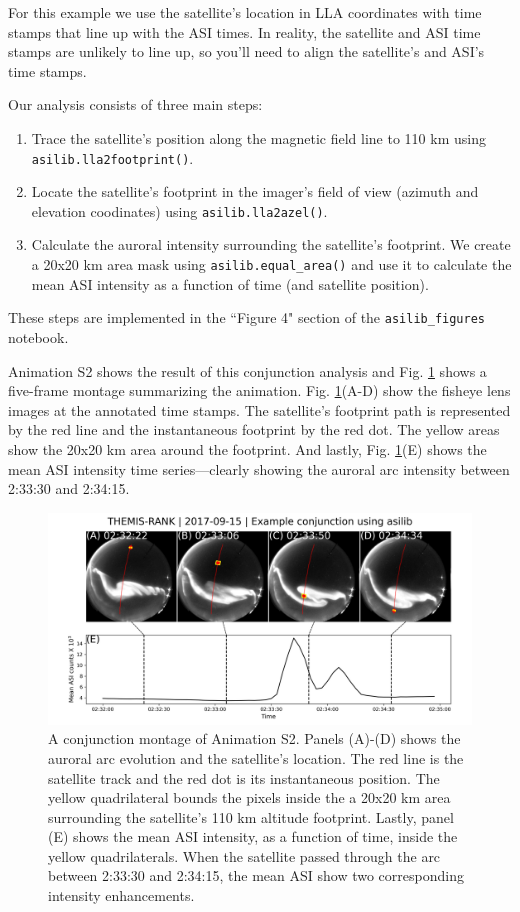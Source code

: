 \documentclass[utf8]{FrontiersinHarvard} %
\begin{document}
For this example we use the satellite's location in LLA coordinates with time stamps that line up with the ASI times. In reality, the satellite and ASI time stamps are unlikely to line up, so you'll need to align the satellite's and ASI's time stamps.

Our analysis consists of three main steps:
\begin{enumerate}
    \item Trace the satellite's position along the magnetic field line to 110 km using  \verb|asilib.lla2footprint()|.
    \item Locate the satellite's footprint in the imager's field of view (azimuth and elevation coodinates) using \verb|asilib.lla2azel()|.
    \item Calculate the auroral intensity surrounding the satellite's footprint. We create a 20x20 km area mask using \verb|asilib.equal_area()| and use it to calculate the mean ASI intensity as a function of time (and satellite position).
\end{enumerate} These steps are implemented in the ``Figure 4" section of the \verb|asilib_figures| notebook.

Animation S2 shows the result of this conjunction analysis and Fig. \ref{fig4} shows a five-frame montage summarizing the animation. Fig. \ref{fig4}(A-D) show the fisheye lens images at the annotated time stamps. The satellite's footprint path is represented by the red line and the instantaneous footprint by the red dot. The yellow areas show the 20x20 km area around the footprint. And lastly, Fig. \ref{fig4}(E) shows the mean ASI intensity time series---clearly showing the auroral arc intensity between 2:33:30 and 2:34:15.

\begin{figure}
      \includegraphics[width=\textwidth]{figures/fig4.jpg}
      \caption{A conjunction montage of Animation S2. Panels (A)-(D) shows the auroral arc evolution and the satellite's location. The red line is the satellite track and the red dot is its instantaneous position. The yellow quadrilateral bounds the pixels inside the a 20x20 km area surrounding the satellite's 110 km altitude footprint. Lastly, panel (E) shows the mean ASI intensity, as a function of time, inside the yellow quadrilaterals. When the satellite passed through the arc between 2:33:30 and 2:34:15, the mean ASI show two corresponding intensity enhancements.}
      \label{fig4}
\end{figure}
\end{document}
